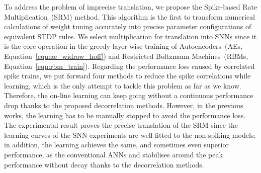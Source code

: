 To address the problem of imprecise translation, we propose the Spike-based Rate Multiplication~(SRM) method.
This algorithm is the first to transform numerical calculations of weight tuning accurately into precise parameter configurations of equivalent STDP rules.
We select multiplication for translation into SNNs since it is the core operation in the greedy layer-wise training of Autoencoders~(AEs, Equation~\ref{equ:ae_widrow_hoff}) and Restricted Boltzmann Machines~(RBMs, Equation~\ref{equ:rbm_train}).
Regarding the performance loss caused by correlated spike trains, we put forward four methods to reduce the spike correlations while learning, which is the only attempt to tackle this problem as far as we know.
Therefore, the on-line learning can keep going without a continuous performance drop thanks to the proposed decorrelation methods. 
However, in the previous works, the learning has to be manually stopped to avoid the performance loss.  
The experimental result proves the precise translation of the SRM since the learning curves of the SNN experiments are well fitted to the non-spiking models;
in addition, the learning achieves the same, and sometimes even superior performance, as the conventional ANNs and stabilises around the peak performance without decay thanks to the decorrelation methods.









